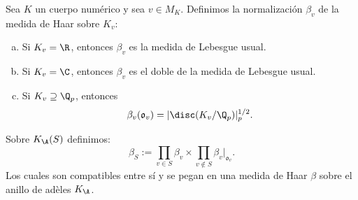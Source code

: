 \documentclass[teoria-numeros.tex]{subfiles}
\begin{document}
\begin{mydef}
	Sea $K$ un cuerpo numérico y sea $v \in M_K$.
	Definimos la normalización $\beta_v$ de la medida de Haar sobre $K_v$:
	\begin{enumerate}[(a)]
		\item Si $K_v = \R$, entonces $\beta_v$ es la medida de Lebesgue usual.
		\item Si $K_v = \C$, entonces $\beta_v$ es el doble de la medida de Lebesgue usual.
		\item Si $K_v \supseteq \Q_p$, entonces
			$$ \beta_v(\mathfrak{o}_v) = |\disc(K_v/\Q_p)|_p^{1/2}. $$
	\end{enumerate}
\end{mydef}
Sobre $K_\A(S)$ definimos:
$$ \beta_S := \prod_{v \in S} \beta_v \times \prod_{v \notin S} \beta_v|_{\mathfrak{o}_v}. $$
Los cuales son compatibles entre sí y se pegan en una medida de Haar $\beta$ sobre el anillo de adèles $K_\A$.
\end{document}

